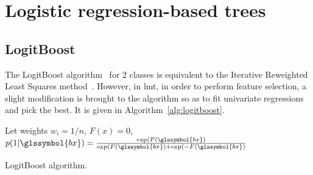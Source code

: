 \section{Logistic regression-based trees}


%
%

%
%


%
%


\subsection{LogitBoost} \label{LogitBoost}

The LogitBoost algorithm~\cite{friedman2000additive} for 2 classes is equivalent to the Iterative Reweighted Least Squares method~\cite{friedman2001elements}. However, in \gls{lmt}, in order to perform feature selection, a slight modification is brought to the algorithm so as to fit univariate regressions and pick the best. It is given in Algorithm~\ref{alg:logitboost}.

\begin{algorithm}[H]
Let weights $w_i = 1 / n$, $F(x) = 0$, $p(1 | \glssymbol{bx}) = \frac{\exp(F(\glssymbol{bx})}{\exp(F(\glssymbol{bx}) + \exp(-F(\glssymbol{bx})}$\;
 \caption{\label{alg:logitboost} LogitBoost algorithm.}
\end{algorithm}



